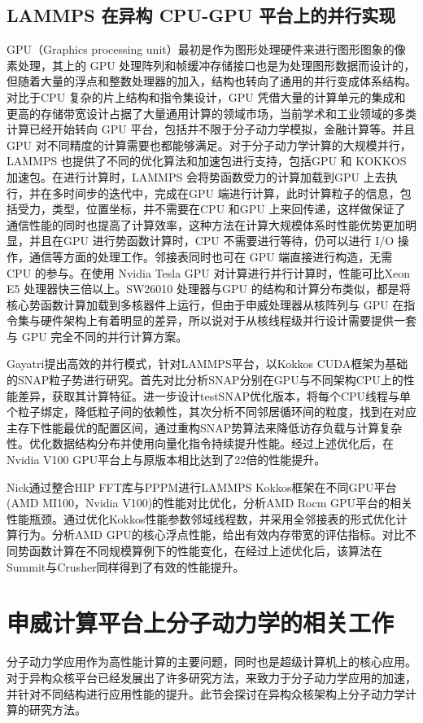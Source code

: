 \subsection{LAMMPS 在异构 CPU-GPU 平台上的并行实现}
GPU（Graphics processing unit）最初是作为图形处理硬件来进行图形图象的像素处理，其上的 GPU 处理阵列和帧缓冲存储接口也是为处理图形数据而设计的，但随着大量的浮点和整数处理器的加入，结构也转向了通用的并行变成体系结构。对比于CPU 复杂的片上结构和指令集设计，GPU 凭借大量的计算单元的集成和更高的存储带宽设计占据了大量通用计算的领域市场，当前学术和工业领域的多类计算已经开始转向 GPU 平台，包括并不限于分子动力学模拟，金融计算等。并且 GPU 对不同精度的计算需要也都能够满足。对于分子动力学计算的大规模并行，LAMMPS 也提供了不同的优化算法和加速包进行支持，包括GPU 和 KOKKOS 加速包。在进行计算时，LAMMPS 会将势函数受力的计算加载到GPU 上去执行，并在多时间步的迭代中，完成在GPU 端进行计算，此时计算粒子的信息，包括受力，类型，位置坐标，并不需要在CPU 和GPU 上来回传递，这样做保证了通信性能的同时也提高了计算效率，这种方法在计算大规模体系时性能优势更加明显，并且在GPU 进行势函数计算时，CPU 不需要进行等待，仍可以进行 I/O 操作，通信等方面的处理工作。邻接表同时也可在 GPU 端直接进行构造，无需 CPU 的参与。在使用 Nvidia Tesla GPU 对计算进行并行计算时，性能可比Xeon E5 处理器快三倍以上。SW26010 处理器与GPU 的结构和计算分布类似，都是将核心势函数计算加载到多核器件上运行，但由于申威处理器从核阵列与 GPU 在指令集与硬件架构上有着明显的差异，所以说对于从核线程级并行设计需要提供一套与 GPU 完全不同的并行计算方案。

Gayatri\cite{gayatri2020rapid}提出高效的并行模式，针对LAMMPS平台，以Kokkos CUDA框架为基础的SNAP粒子势进行研究。首先对比分析SNAP分别在GPU与不同架构CPU上的性能差异，获取其计算特征。进一步设计testSNAP优化版本，将每个CPU线程与单个粒子绑定，降低粒子间的依赖性，其次分析不同邻居循环间的粒度，找到在对应主存下性能最优的配置区间，通过重构SNAP势算法来降低访存负载与计算复杂性。优化数据结构分布并使用向量化指令持续提升性能。经过上述优化后，在Nvidia V100 GPU平台上与原版本相比达到了22倍的性能提升。

Nick\cite{hagerty2022studying}通过整合HIP FFT库与PPPM进行LAMMPS Kokkos框架在不同GPU平台(AMD MI100，Nvidia V100)的性能对比优化，分析AMD Rocm GPU平台的相关性能瓶颈。通过优化Kokkos性能参数邻域线程数，并采用全邻接表的形式优化计算行为。分析AMD GPU的核心浮点性能，给出有效内存带宽的评估指标。对比不同势函数计算在不同规模算例下的性能变化，在经过上述优化后，该算法在Summit与Crusher同样得到了有效的性能提升。

\section{申威计算平台上分子动力学的相关工作}
分子动力学应用作为高性能计算的主要问题，同时也是超级计算机上的核心应用。对于异构众核平台已经发展出了许多研究方法，来致力于分子动力学应用的加速，并针对不同结构进行应用性能的提升。此节会探讨在异构众核架构上分子动力学计算的研究方法。

